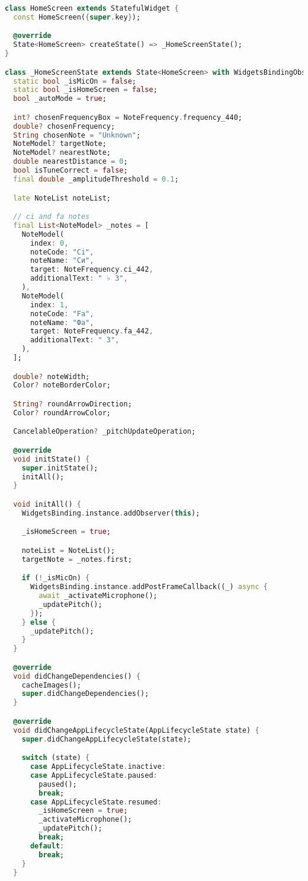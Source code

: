 \begin{lstlisting}[language=Dart, caption=Нүүр хуудас дахь логикийн хэрэгжүүлэлт, frame=single]
class HomeScreen extends StatefulWidget {
  const HomeScreen({super.key});

  @override
  State<HomeScreen> createState() => _HomeScreenState();
}

class _HomeScreenState extends State<HomeScreen> with WidgetsBindingObserver {
  static bool _isMicOn = false;
  static bool _isHomeScreen = false;
  bool _autoMode = true;

  int? chosenFrequencyBox = NoteFrequency.frequency_440;
  double? chosenFrequency;
  String chosenNote = "Unknown";
  NoteModel? targetNote;
  NoteModel? nearestNote;
  double nearestDistance = 0;
  bool isTuneCorrect = false;
  final double _amplitudeThreshold = 0.1;

  late NoteList noteList;

  // ci and fa notes
  final List<NoteModel> _notes = [
    NoteModel(
      index: 0,
      noteCode: "Ci",
      noteName: "Си",
      target: NoteFrequency.ci_442,
      additionalText: " ♭ 3",
    ),
    NoteModel(
      index: 1,
      noteCode: "Fa",
      noteName: "Фа",
      target: NoteFrequency.fa_442,
      additionalText: " 3",
    ),
  ];

  double? noteWidth;
  Color? noteBorderColor;

  String? roundArrowDirection;
  Color? roundArrowColor;

  CancelableOperation? _pitchUpdateOperation;

  @override
  void initState() {
    super.initState();
    initAll();
  }

  void initAll() {
    WidgetsBinding.instance.addObserver(this);

    _isHomeScreen = true;

    noteList = NoteList();
    targetNote = _notes.first;

    if (!_isMicOn) {
      WidgetsBinding.instance.addPostFrameCallback((_) async {
        await _activateMicrophone();
        _updatePitch();
      });
    } else {
      _updatePitch();
    }
  }

  @override
  void didChangeDependencies() {
    cacheImages();
    super.didChangeDependencies();
  }

  @override
  void didChangeAppLifecycleState(AppLifecycleState state) {
    super.didChangeAppLifecycleState(state);

    switch (state) {
      case AppLifecycleState.inactive:
      case AppLifecycleState.paused:
        paused();
        break;
      case AppLifecycleState.resumed:
        _isHomeScreen = true;
        _activateMicrophone();
        _updatePitch();
        break;
      default:
        break;
    }
  }


\end{lstlisting}

